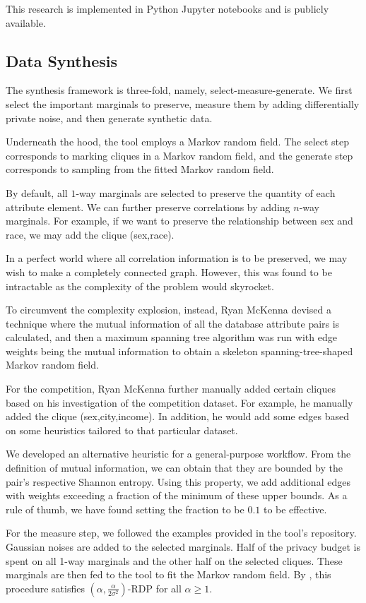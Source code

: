 \documentclass[acmsmall,sigconf]{acmart}
\begin{document}
This research is implemented in Python Jupyter notebooks and is publicly available.

\subsection{Data Synthesis}

The synthesis framework is three-fold, namely, select-measure-generate\cite{McKenna2022}. We first select the important marginals to preserve, measure them by adding differentially private noise, and then generate synthetic data.

Underneath the hood, the tool employs a Markov random field. The select step corresponds to marking cliques in a Markov random field, and the generate step corresponds to sampling from the fitted Markov random field.

By default, all $1$-way marginals are selected to preserve the quantity of each attribute element. We can further preserve correlations by adding $n$-way marginals. For example, if we want to preserve the relationship between sex and race, we may add the clique (sex,race).

In a perfect world where all correlation information is to be preserved, we may wish to make a completely connected graph. However, this was found to be intractable as the complexity of the problem would skyrocket.

To circumvent the complexity explosion, instead, Ryan McKenna devised a technique where the mutual information of all the database attribute pairs is calculated, and then a maximum spanning tree algorithm was run with edge weights being the mutual information to obtain a skeleton spanning-tree-shaped Markov random field.

For the competition, Ryan McKenna further manually added certain cliques based on his investigation of the competition dataset. For example, he manually added the clique (sex,city,income). In addition, he would add some edges based on some heuristics tailored to that particular dataset.

We developed an alternative heuristic for a general-purpose workflow. From the definition of mutual information, we can obtain that they are bounded by the pair's respective Shannon entropy. Using this property, we add additional edges with weights exceeding a fraction of the minimum of these upper bounds. As a rule of thumb, we have found setting the fraction to be $0.1$ to be effective.

For the measure step, we followed the examples provided in the tool's repository. Gaussian noises are added to the selected marginals. Half of the privacy budget is spent on all 1-way marginals and the other half on the selected cliques. These marginals are then fed to the tool to fit the Markov random field. By \cite{mckenna2021winning}, this procedure satisfies $(\alpha,\frac{\alpha}{2 \sigma^2})$-RDP for all $\alpha \geq 1$.
\end{document}
